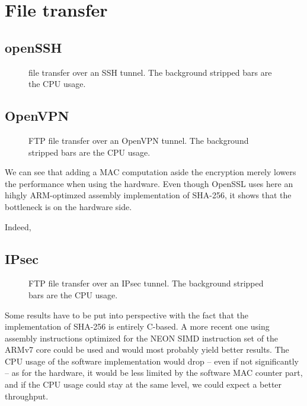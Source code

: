 \section{File transfer}


\subsection{openSSH}

\begin{figure}[ht]

\caption{file transfer over an SSH tunnel. The background stripped bars are the CPU usage.}{}
\label{fig:openssh-bench}
\end{figure}

\subsection{OpenVPN}

\begin{figure}[ht]

\caption{FTP file transfer over an OpenVPN tunnel. The background stripped bars are the CPU usage.}{}
\label{fig:openvpn-ftp-bench}
\end{figure}

We can see that adding a MAC computation aside the encryption merely lowers the performance when using the hardware.
Even though OpenSSL uses here an hihgly ARM-optimzed assembly implementation of SHA-256, it shows that the bottleneck is on the hardware side.

Indeed, 

\subsection{IPsec}

\begin{figure}[ht]

\caption{FTP file transfer over an IPsec tunnel. The background stripped bars are the CPU usage.}{}
\label{fig:ipsec-ftp-bench}
\end{figure}

Some results have to be put into perspective with the fact that the implementation of SHA-256 is entirely C-based.
A more recent one using assembly instructions optimized for the NEON SIMD instruction set of the ARMv7 core could be used and would most probably yield better results.
The CPU usage of the software implementation would drop -- even if not significantly -- as for the hardware, it would be less limited by the software MAC counter part, and if the CPU usage could stay at the same level, we could expect a better throughput.

